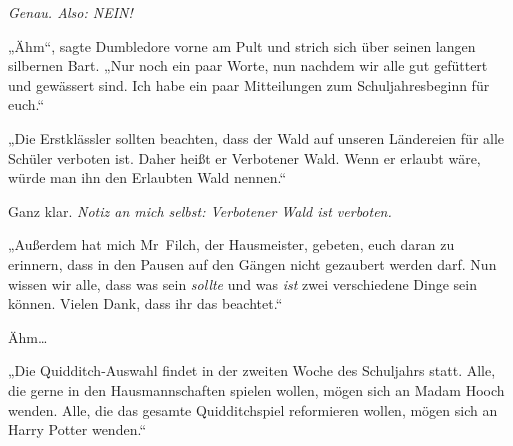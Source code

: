 \emph{Genau. Also: NEIN!}

„Ähm“, sagte Dumbledore vorne am Pult und strich sich über seinen langen silbernen Bart. „Nur noch ein paar Worte, nun nachdem wir alle gut gefüttert und gewässert sind. Ich habe ein paar Mitteilungen zum Schuljahresbeginn für euch.“

„Die Erstklässler sollten beachten, dass der Wald auf unseren Ländereien für alle Schüler verboten ist. Daher heißt er Verbotener Wald. Wenn er erlaubt wäre, würde man ihn den Erlaubten Wald nennen.“

Ganz klar. \emph{Notiz an mich selbst: Verbotener Wald ist verboten.}

„Außerdem hat mich Mr~Filch, der Hausmeister, gebeten, euch daran zu erinnern, dass in den Pausen auf den Gängen nicht gezaubert werden darf. Nun wissen wir alle, dass was sein \emph{sollte} und was \emph{ist} zwei verschiedene Dinge sein können. Vielen Dank, dass ihr das beachtet.“


Ähm…

„Die Quidditch-Auswahl findet in der zweiten Woche des Schuljahrs statt. Alle, die gerne in den Hausmannschaften spielen wollen, mögen sich an Madam Hooch wenden. Alle, die das gesamte Quidditchspiel reformieren wollen, mögen sich an Harry Potter wenden.“

